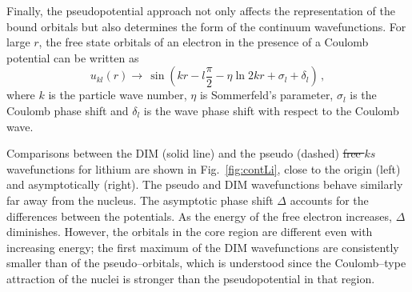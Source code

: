 \documentclass[10pt]{article}
\providecommand{\DIFaddtex}[1]{{\protect\color{blue}\uwave{#1}}} %
\providecommand{\DIFdeltex}[1]{{\protect\color{red}\sout{#1}}}                      %
\providecommand{\DIFaddbegin}{} %
\providecommand{\DIFaddend}{} %
\providecommand{\DIFdelbegin}{} %
\providecommand{\DIFdelend}{} %
\providecommand{\DIFadd}[1]{\texorpdfstring{\DIFaddtex{#1}}{#1}} %
\providecommand{\DIFdel}[1]{\texorpdfstring{\DIFdeltex{#1}}{}} %
\begin{document}
Finally, the pseudopotential approach not only affects the 
representation of the bound orbitals but also determines the form of 
the continuum wavefunctions. For large $r$, the free state orbitals 
of an electron in the presence of a Coulomb potential can be written 
as
\begin{equation}
 u_{kl}(r) \rightarrow \,\sin \left( kr - l\frac{\pi}{2} - \eta \ln 2kr +
 \sigma_l + \delta_l \right)\,,
\end{equation}
where $k$ is the particle wave number, $\eta$ is Sommerfeld's 
parameter, $\sigma_l$ is the Coulomb phase shift and $\delta_l$ is 
the wave phase shift with respect to the Coulomb wave.

Comparisons between the DIM (solid line) and the pseudo (dashed)
\DIFdelbegin \DIFdel{free $ks$ }\DIFdelend \DIFaddbegin \DIFadd{continuum }\DIFaddend wavefunctions for lithium are shown in 
Fig.~\ref{fig:contLi}, close to the origin (left) and asymptotically 
(right). The pseudo and DIM wavefunctions behave similarly far away 
from the nucleus. The asymptotic phase shift $\Delta$ accounts for 
the differences between the potentials. As the energy of the free 
electron increases, $\Delta$ diminishes. However, the orbitals in the 
core region are different even with increasing energy; the first 
maximum of the DIM wavefunctions are consistently smaller than of the 
pseudo--orbitals, which is understood since the Coulomb--type 
attraction of the nuclei is stronger than the pseudopotential in that 
region. 
\end{document}
